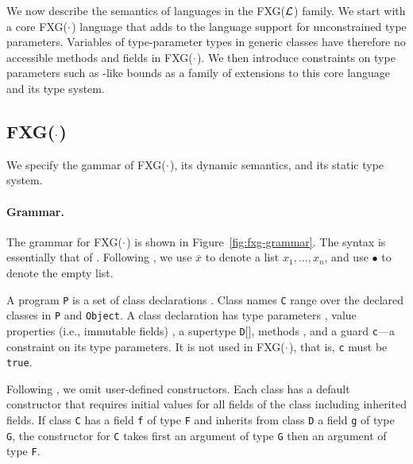 \newcommand\wj[2]{{#1} \vdash_{\cal W}{#2}}
\newcommand\cdecl{{\tt class}~{\tt C}[\tbar{X}]\{{\tt c}\}(\tbar{f}\ty\tbar{F})~{\tt extends}~{\tt D}[\tbar{E}]~\{~\tbar{M}~\}}
\newcommand\minst[6]{{\tt m}[\tbar{#1}](\tbar{#2}\ty\tbar{#3})\{{\tt #4}\}\ty{\tt #5}={\tt #6}}
\newcommand\mdecl[6]{{\tt def}~\minst{#1}{#2}{#3}{#4}{#5}{#6}}
\newcommand\FXGL[1]{{\sf FXG($\cal #1$)}}
\newcommand{\vdashQ}{\vdash_{\cal Q}}
\newcommand{\Dom}{{\sf Dom}}
\newcommand{\Img}{{\sf Img}}

We now describe the semantics of languages in the \FXGL{L} family. We start with a core \FXGL{\cdot} language that adds to the \FX language support for unconstrained type parameters. Variables of type-parameter types in generic classes have therefore no accessible methods and fields in \FXGL{\cdot}. We then introduce constraints on type parameters such as \FGJ-like bounds as a family of extensions to this core language and its type system.


\subsection{\FXGL{\cdot}}

We specify the gammar of \FXGL{\cdot}, its dynamic semantics, and its static type system.

\paragraph{Grammar.} The grammar for \FXGL{\cdot} is shown in Figure~\ref{fig:fxg-grammar}. The syntax is essentially that of \FGJ. Following \FJ{}, we use $\bar{x}$ to denote a list $x_1, \dots, x_n$, and use $\bullet$ to denote the empty list.

A program {\tt P} is a set of class declarations . Class names {\tt C} range over the declared classes in {\tt P} and {\tt Object}. A class declaration has type parameters , value properties (i.e., immutable fields) , a supertype {\tt D}[], methods , and a guard {\tt c}---a constraint on its type parameters. It is not used in \FXGL{\cdot}, that is, {\tt c} must be {\tt true}.

Following \FJ{}, we omit user-defined constructors. Each class has a default constructor that requires initial values for all fields of the class including inherited fields. If class {\tt C} has a field {\tt f} of type {\tt F} and inherits from class {\tt D} a field {\tt g} of type {\tt G}, the constructor for {\tt C} takes first an argument of type {\tt G} then an argument of type {\tt F}.

